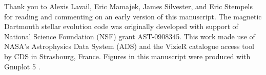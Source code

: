 \documentclass{aa}
\begin{document}
\begin{acknowledgements}
Thank you to Alexis Lavail, Eric Mamajek, James Silvester, and Eric Stempels for reading and commenting on an early version of this manuscript. The magnetic Dartmouth stellar evolution code was originally developed with support of National Science Foundation (NSF) grant AST-0908345. This work made use of NASA's Astrophysics Data System (ADS) and the VizieR catalogue access tool by CDS in Strasbourg, France. Figures in this manuscript were produced with Gnuplot 5 \citep{Gnuplot5.0}.
\end{acknowledgements}


\end{document}
